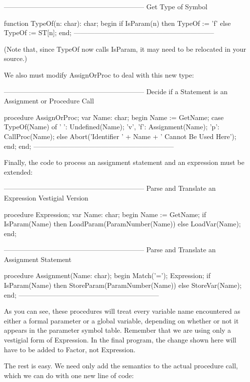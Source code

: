 \documentclass[float=false, crop=false]{standalone}
\begin{document}
{--------------------------------------------------------------}
{ Get Type of Symbol }

function TypeOf(n: char): char;
begin
     if IsParam(n) then
          TypeOf := 'f'
     else
          TypeOf := ST[n];
end;
{--------------------------------------------------------------}


(Note that, since TypeOf now calls IsParam, it may need to be relocated in your
source.)

We also must modify AssignOrProc to deal with this new type:


{--------------------------------------------------------------}
{ Decide if a Statement is an Assignment or Procedure Call }

procedure AssignOrProc;
var Name: char;
begin
     Name := GetName;
     case TypeOf(Name) of
          ' ': Undefined(Name);
          'v', 'f': Assignment(Name);
          'p': CallProc(Name);
          else  Abort('Identifier ' + Name +  '  Cannot  Be  Used
Here');
     end;
end;
{--------------------------------------------------------------}


Finally, the code to process an assignment statement and an expression must be
extended:


{--------------------------------------------------------------}
{ Parse and Translate an Expression }
{ Vestigial Version }

procedure Expression;
var Name: char;
begin
     Name := GetName;
     if IsParam(Name) then
          LoadParam(ParamNumber(Name))
     else
          LoadVar(Name);
end;


{--------------------------------------------------------------}
{ Parse and Translate an Assignment Statement }

procedure Assignment(Name: char);
begin
     Match('=');
     Expression;
     if IsParam(Name) then
          StoreParam(ParamNumber(Name))
     else
          StoreVar(Name);
end;
{--------------------------------------------------------------}


As you can see, these procedures will treat every variable name encountered as
either a formal parameter or a global variable, depending on whether or not it
appears in the parameter symbol table. Remember that we are using only a
vestigial form of Expression. In the final program, the change shown here will
have to be added to Factor, not Expression.

The rest is easy. We need only add the semantics to the actual procedure call,
which we can do with one new line of code:
\end{document}
